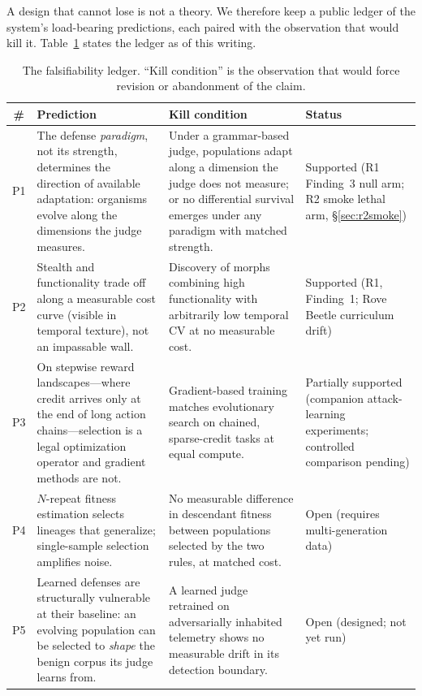 \documentclass[11pt,a4paper]{article}
\begin{document}
A design that cannot lose is not a theory. We therefore keep a public ledger of the system's load-bearing predictions, each paired with the observation that would kill it. Table~\ref{tab:ledger} states the ledger as of this writing.

\begin{table}[t]
\centering\small
\caption{The falsifiability ledger. ``Kill condition'' is the observation that would force revision or abandonment of the claim.}
\label{tab:ledger}
\begin{tabular}{@{}c p{5.1cm} p{4.6cm} p{2.2cm}@{}}
\toprule
\# & Prediction & Kill condition & Status \\
\midrule
P1 & The defense \emph{paradigm}, not its strength, determines the direction of available adaptation: organisms evolve along the dimensions the judge measures. & Under a grammar-based judge, populations adapt along a dimension the judge does not measure; or no differential survival emerges under any paradigm with matched strength. & Supported (R1 Finding~3 null arm; R2 smoke lethal arm, \S\ref{sec:r2smoke}) \\
\addlinespace
P2 & Stealth and functionality trade off along a measurable cost curve (visible in temporal texture), not an impassable wall. & Discovery of morphs combining high functionality with arbitrarily low temporal CV at no measurable cost. & Supported (R1, Finding~1; Rove Beetle curriculum drift) \\
\addlinespace
P3 & On stepwise reward landscapes---where credit arrives only at the end of long action chains---selection is a legal optimization operator and gradient methods are not. & Gradient-based training matches evolutionary search on chained, sparse-credit tasks at equal compute. & Partially supported (companion attack-learning experiments; controlled comparison pending) \\
\addlinespace
P4 & $N$-repeat fitness estimation selects lineages that generalize; single-sample selection amplifies noise. & No measurable difference in descendant fitness between populations selected by the two rules, at matched cost. & Open (requires multi-generation data) \\
\addlinespace
P5 & Learned defenses are structurally vulnerable at their baseline: an evolving population can be selected to \emph{shape} the benign corpus its judge learns from. & A learned judge retrained on adversarially inhabited telemetry shows no measurable drift in its detection boundary. & Open (designed; not yet run) \\
\bottomrule
\end{tabular}
\end{table}
\end{document}
